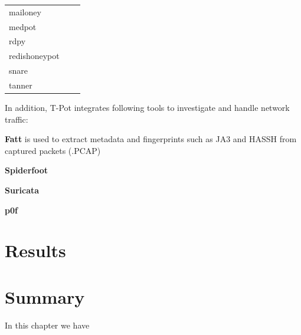 \begin{table}
\begin{tabularx}{\linewidth}{l|l|l}
        mailoney                                 &                      &               \\
        medpot \cite{medpot2021}                 &                      &               \\
        rdpy \cite{rdpy2021}                     &                      &               \\
        redishoneypot                            &                      &               \\
        snare \cite{snare2021}                   &                      &               \\
        tanner \cite{tanner2021}                 &                      &               \\
        \bottomrule
    \end{tabularx}
    \label{tab:overview-honeypots}
\end{table}

In addition, T-Pot integrates following tools to investigate and handle network traffic:

\textbf{Fatt}\cite{fatt2021} is used to extract metadata and fingerprints such as JA3 and HASSH from captured packets (.PCAP)

\textbf{Spiderfoot}

\textbf{Suricata}

\textbf{p0f}

\section{Results}
\label{sec:honeypots-heicloud}


\section{Summary}

In this chapter we have



